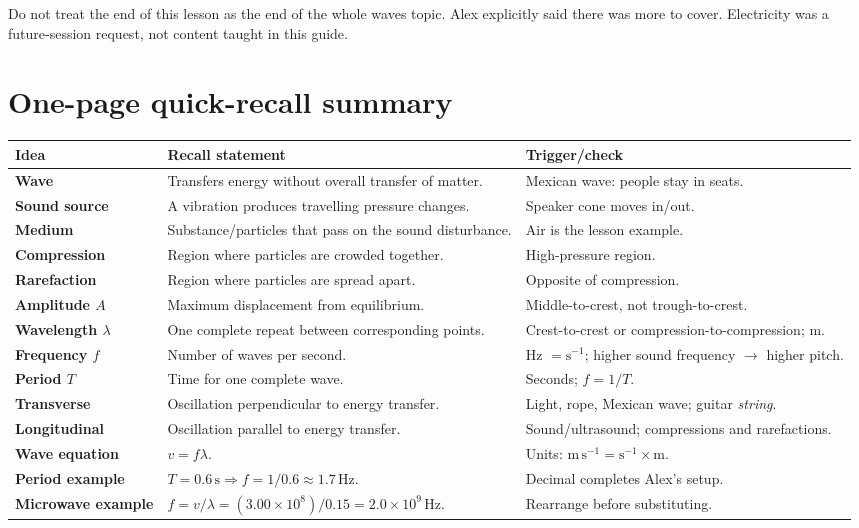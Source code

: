 \documentclass[11pt,a4paper]{article}
\newcommand{\trap}[1]{\begin{mistakebox}#1\end{mistakebox}}
\begin{document}
\trap{Do not treat the end of this lesson as the end of the whole waves topic. Alex explicitly said there was more to cover. Electricity was a future-session request, not content taught in this guide.}

\clearpage
\section{One-page quick-recall summary}
\small
\begin{tabular}{>{\bfseries}p{3.0cm}p{8.1cm}p{3.5cm}}
\toprule Idea & Recall statement & Trigger/check \\ \midrule
Wave & Transfers energy without overall transfer of matter. & Mexican wave: people stay in seats. \\
Sound source & A vibration produces travelling pressure changes. & Speaker cone moves in/out. \\
Medium & Substance/particles that pass on the sound disturbance. & Air is the lesson example. \\
Compression & Region where particles are crowded together. & High-pressure region. \\
Rarefaction & Region where particles are spread apart. & Opposite of compression. \\
Amplitude $A$ & Maximum displacement from equilibrium. & Middle-to-crest, not trough-to-crest. \\
Wavelength $\lambda$ & One complete repeat between corresponding points. & Crest-to-crest or compression-to-compression; m. \\
Frequency $f$ & Number of waves per second. & Hz $=\mathrm{s^{-1}}$; higher sound frequency $\rightarrow$ higher pitch. \\
Period $T$ & Time for one complete wave. & Seconds; $f=1/T$. \\
Transverse & Oscillation perpendicular to energy transfer. & Light, rope, Mexican wave; guitar \emph{string}. \\
Longitudinal & Oscillation parallel to energy transfer. & Sound/ultrasound; compressions and rarefactions. \\
Wave equation & $v=f\lambda$. & Units: $\mathrm{m\,s^{-1}}=\mathrm{s^{-1}}\times\mathrm{m}$. \\
Period example & $T=0.6\,\mathrm{s}\Rightarrow f=1/0.6\approx1.7\,\mathrm{Hz}$. & Decimal completes Alex's setup. \\
Microwave example & $f=v/\lambda=(3.00\times10^8)/0.15=2.0\times10^9\,\mathrm{Hz}$. & Rearrange before substituting. \\

\end{tabular}
\end{document}
